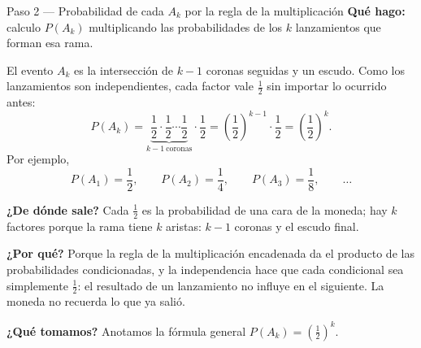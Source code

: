 \documentclass[11pt]{article}
\begin{document}
\begin{paso}{Paso 2 --- Probabilidad de cada $A_k$ por la regla de la multiplicación}
\textbf{Qué hago:} calculo $P(A_k)$ multiplicando las probabilidades de los $k$ lanzamientos que forman esa rama.

El evento $A_k$ es la intersección de $k-1$ coronas seguidas y un escudo. Como los lanzamientos son independientes, cada factor vale $\tfrac12$ sin importar lo ocurrido antes:
\[
P(A_k)=\underbrace{\frac{1}{2}\cdot\frac{1}{2}\cdots\frac{1}{2}}_{k-1\ \text{coronas}}\cdot\frac{1}{2}
=\left(\frac{1}{2}\right)^{k-1}\cdot\frac{1}{2}
=\left(\frac{1}{2}\right)^{k}.
\]
Por ejemplo,
\[
P(A_1)=\frac12,\qquad P(A_2)=\frac14,\qquad P(A_3)=\frac18,\qquad\dots
\]

\begin{center}
\end{center}

\textbf{¿De dónde sale?} Cada $\tfrac12$ es la probabilidad de una cara de la moneda; hay $k$ factores porque la rama tiene $k$ aristas: $k-1$ coronas y el escudo final.

\textbf{¿Por qué?} Porque la regla de la multiplicación encadenada da el producto de las probabilidades condicionadas, y la independencia hace que cada condicional sea simplemente $\tfrac12$: el resultado de un lanzamiento no influye en el siguiente. La moneda no recuerda lo que ya salió.

\textbf{¿Qué tomamos?} Anotamos la fórmula general $P(A_k)=\left(\tfrac12\right)^{k}$.
\end{paso}
\end{document}
